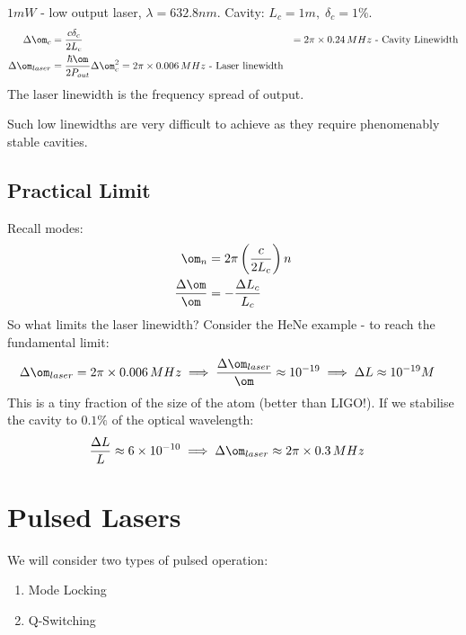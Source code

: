 \documentclass[a4paper, 11pt, normalem]{report}
\begin{document}
\begin{example}
$1mW$ - low output laser, $\lambda=632.8nm$.
Cavity: $L_c=1m,\;\delta_c=1\%$.
\begin{align}
    \Delta\om_c &= \frac{c\delta_c}{2L_c} &= 2\pi\times0.24\,MHz \text{ - Cavity Linewidth} \\
    \Delta\om_{laser} &= \frac{\hbar\om}{2P_{out}}\Delta\om_c^2 = 2\pi\times0.006\,MHz \text{ - Laser linewidth}
\end{align}
The laser linewidth is the frequency spread of output.
\end{example}
Such low linewidths are very difficult to achieve as they require phenomenably stable cavities.

\section{Practical Limit}
Recall modes:
\begin{align}
    \om_n &= 2\pi\left(\frac{c}{2L_c}\right)n \\
    \frac{\Delta\om}{\om} &= -\frac{\Delta L_c}{L_c}
\end{align}
So what limits the laser linewidth?
Consider the HeNe example - to reach the fundamental limit:
\begin{align}
    \Delta\om_{laser} &= 2\pi\times0.006\,MHz \implies \frac{\Delta\om_{laser}}{\om} \approx 10^{-19} \implies \Delta L \approx 10^{-19}M
\end{align}
This is a tiny fraction of the size of the atom (better than LIGO!).
If we stabilise the cavity to $0.1\%$ of the optical wavelength:
\begin{align}
    \frac{\Delta L}{L} &\approx 6\times10^{-10} \implies \Delta\om_{laser} \approx 2\pi\times0.3\,MHz
\end{align}



\chapter{Pulsed Lasers}
We will consider two types of pulsed operation:
\begin{enumerate}
    \item Mode Locking
    \item Q-Switching
\end{enumerate}
\end{document}
